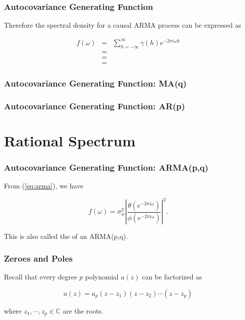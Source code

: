 \documentclass[%
xcolor=pdftex]{beamer}
\begin{document}
\begin{frame}
\frametitle{Autocovariance Generating Function}

Therefore the spectral density for a causal ARMA process can be expressed as

\begin{eqnarray} \label{eq:arma}
f(\omega) &=& \sum_{h=-\infty}^{\infty} \gamma(h) e^{-2 \pi i \omega h} \nonumber \\
          &=& \nonumber \\
          &=& \nonumber \\
          &=&
\end{eqnarray}

\end{frame}

\begin{frame}
\frametitle{Autocovariance Generating Function: MA(q)}


\end{frame}

\begin{frame}
\frametitle{Autocovariance Generating Function: AR(p)}


\end{frame}

\section{Rational Spectrum}
\frame{\tableofcontents[currentsection]}

\begin{frame}
\frametitle{Autocovariance Generating Function: ARMA(p,q)}

From (\ref{eq:arma}), we have

\begin{equation*} 
f(\omega) = \sigma_w^2 \left \lvert \frac{\theta(e^{-2 \pi i \omega})}{\phi(e^{-2 \pi i \omega})} \right \rvert ^2.
\end{equation*}

This is also called the \underline{\hspace{25 mm}} of an ARMA(p,q).


\end{frame}

\begin{frame}
\frametitle{Zeroes and Poles}

Recall that every degree $p$ polynomial $a(z)$ can be factorized as

$$
a(z) = a_p(z-z_1)(z-z_2)\cdots(z-z_p)
$$

where $z_1, \cdots, z_p \in \mathbb{C}$ are the roots.

\end{frame}
\end{document}
